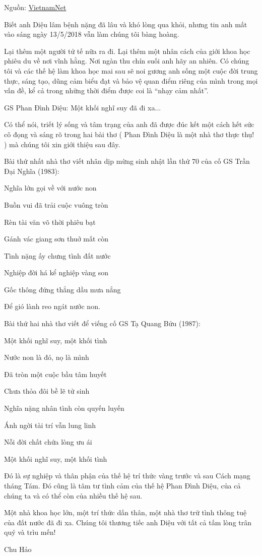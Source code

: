 

Nguồn: \href{https://vietnamnet.vn/vn/giao-duc/khoa-hoc/gs-phan-dinh-dieu-mot-khoi-nghi-suy-da-di-xa-450884.html?fbclid=IwAR0IfkBod1DmSxn3QFHzFzVdQuncg1bMbJd1uRmmD1O69x72sYwNHR6MRnQ}{VietnamNet}


Biết anh Diệu lâm bệnh nặng đã lâu và khó lòng qua khỏi, nhưng tin anh mất vào sáng ngày 13/5/2018 vẫn làm chúng tôi bàng hoàng.

Lại thêm một người tử tế nữa ra đi. Lại thêm một nhân cách của giới khoa học phiêu du về nơi vĩnh hằng. Nơi ngàn thu chín suối anh hãy an nhiên. Có chúng tôi và các thế hệ làm khoa học mai sau sẽ noi gương anh sống một cuộc đời trung thực, sáng tạo, dũng cảm biểu đạt và bảo vệ quan điểm riêng của mình trong mọi vấn đề, kể cả trong những thời điểm được coi là “nhạy cảm nhất”.

GS Phan Đình Diệu: Một khối nghĩ suy đã đi xa...

Có thể nói, triết lý sống và tâm trạng của anh đã được đúc kết một cách hết sức cô đọng và sáng rõ trong hai bài thơ ( Phan Đình Diệu là một nhà thơ thực thụ! ) mà chúng tôi xin giới thiệu sau đây.

Bài thứ nhất nhà thơ viết nhân dịp mừng sinh nhật lần thứ 70 của cố GS Trần Đại Nghĩa (1983):

Nghĩa lớn gọi về với nước non

Buồn vui đã trải cuộc vuông tròn

Rèn tài văn võ thời phiêu bạt

Gánh vác giang sơn thuở mất còn

Tình nặng ấy chưng tình đất nước

Nghiệp đời há kể nghiệp vàng son

Gốc thông đứng thẳng dầu mưa nắng

Để gió lành reo ngát nước non.

Bài thứ hai nhà thơ viết để viếng cố GS Tạ Quang Bửu (1987):

Một khối nghĩ suy, một khối tình

Nước non là đó, nọ là mình

Đã tròn một cuộc bầu tâm huyết

Chưa thỏa đôi bề lẽ tử sinh

Nghĩa nặng nhân tình còn quyến luyến

Ánh ngời tài trí vẫn lung linh

Nỗi đời chất chứa lòng ưu ái

Một khối nghĩ suy, một khối tình


Đó là sự nghiệp và thân phận của thế hệ trí thức vàng trước và sau Cách mạng tháng Tám. Đó cũng là tâm tư tình cảm của thế hệ Phan Đình Diệu, của cả chúng ta và có thể còn của nhiều thế hệ sau.

Một nhà khoa học lớn, một trí thức dấn thân, một nhà thơ trữ tình thông tuệ của đất nước đã đi xa. Chúng tôi thương tiếc anh Diệu với tất cả tấm lòng trân quý và trìu mến! 

Chu Hảo